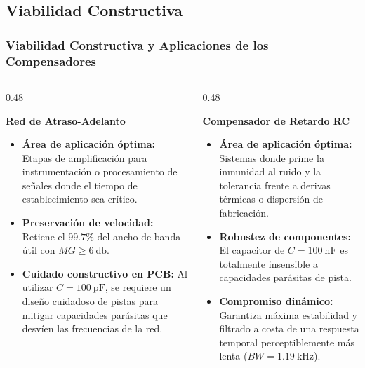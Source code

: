 \subsection{Viabilidad Constructiva}
\begin{frame}
  \frametitle{Viabilidad Constructiva y Aplicaciones de los Compensadores}

  \begin{columns}[t, onlytextwidth]
    \begin{column}{0.48\textwidth}
      \begin{tarjeta}[colframe=BlueAccent, top=4pt, bottom=4pt]
        {\fontsize{8.5pt}{10.5pt}\selectfont \textbf{\color{BlueAccent} Red de Atraso-Adelanto}}\\[2pt]
        {\fontsize{7.2pt}{8.8pt}\selectfont
        \begin{itemize}\setlength{\itemsep}{2pt}
          \item \textbf{Área de aplicación óptima:}
          Etapas de amplificación para instrumentación o procesamiento de señales donde el tiempo de establecimiento sea crítico.
          \item \textbf{Preservación de velocidad:} Retiene el $\mathbf{99.7\%}$ del ancho de banda útil con $MG \ge \qty{6}{\decibel}$.
          \item \textbf{Cuidado constructivo en PCB:}
          Al utilizar $C = \qty{100}{\pico\farad}$, se requiere un diseño cuidadoso de pistas para mitigar capacidades parásitas que desvíen las frecuencias de la red.
        \end{itemize}
        }
      \end{tarjeta}
    \end{column}

    \begin{column}{0.48\textwidth}
      \begin{tarjeta}[top=4pt, bottom=4pt]
        {\fontsize{8.5pt}{10.5pt}\selectfont \textbf{\color{NavyDark} Compensador de Retardo RC}}\\[2pt]
        {\fontsize{7.2pt}{8.8pt}\selectfont
        \begin{itemize}\setlength{\itemsep}{2pt}
          \item \textbf{Área de aplicación óptima:}
          Sistemas donde prime la inmunidad al ruido y la tolerancia frente a derivas térmicas o dispersión de fabricación.
          \item \textbf{Robustez de componentes:}
          El capacitor de $C = \qty{100}{\nano\farad}$ es totalmente insensible a capacidades parásitas de pista.
          \item \textbf{Compromiso dinámico:}
          Garantiza máxima estabilidad y filtrado a costa de una respuesta temporal perceptiblemente más lenta ($BW = \qty{1.19}{\kilo\hertz}$).
        \end{itemize}
        }
      \end{tarjeta}
    \end{column}
  \end{columns}
\end{frame}

